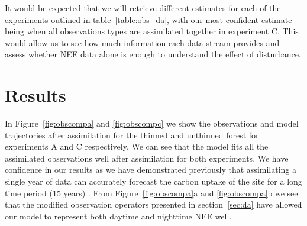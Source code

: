 \documentclass[draft,linenumbers]{agujournal}
\begin{document}
It would be expected that we will retrieve different estimates for each of the experiments outlined in table~\ref{table:obs_da}, with our most confident estimate being when all observations types are assimilated together in experiment C. This would allow us to see how much information each data stream provides and assess whether NEE data alone is enough to understand the effect of disturbance.

\section{Results} \label{sec:results}

In Figure~\ref{fig:obscompa} and \ref{fig:obscompc} we show the observations and model trajectories after assimilation for the  thinned and unthinned forest for experiments A and C respectively. We can see that the model fits all the assimilated observations well after assimilation for both experiments. We have confidence in our results as we have demonstrated previously that assimilating a single year of data can accurately forecast the carbon uptake of the site for a long time period (15 years) \citep{Pinnington2016299}. From Figure~\ref{fig:obscompa}a and \ref{fig:obscompa}b we see that the modified observation operators presented in section~\ref{sec:da} have allowed our model to represent both daytime and nighttime NEE well. 
\end{document}

